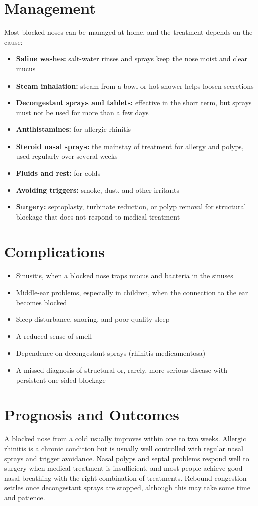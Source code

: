 \section*{Management}
Most blocked noses can be managed at home, and the treatment depends on the cause:

\begin{itemize}
    \item \textbf{Saline washes:} salt-water rinses and sprays keep the nose moist and clear mucus
    \item \textbf{Steam inhalation:} steam from a bowl or hot shower helps loosen secretions
    \item \textbf{Decongestant sprays and tablets:} effective in the short term, but sprays must not be used for more than a few days
    \item \textbf{Antihistamines:} for allergic rhinitis
    \item \textbf{Steroid nasal sprays:} the mainstay of treatment for allergy and polyps, used regularly over several weeks
    \item \textbf{Fluids and rest:} for colds
    \item \textbf{Avoiding triggers:} smoke, dust, and other irritants
    \item \textbf{Surgery:} septoplasty, turbinate reduction, or polyp removal for structural blockage that does not respond to medical treatment
\end{itemize}

\section*{Complications}
\begin{itemize}
    \item Sinusitis, when a blocked nose traps mucus and bacteria in the sinuses
    \item Middle-ear problems, especially in children, when the connection to the ear becomes blocked
    \item Sleep disturbance, snoring, and poor-quality sleep
    \item A reduced sense of smell
    \item Dependence on decongestant sprays (rhinitis medicamentosa)
    \item A missed diagnosis of structural or, rarely, more serious disease with persistent one-sided blockage
\end{itemize}

\section*{Prognosis and Outcomes}
A blocked nose from a cold usually improves within one to two weeks. Allergic rhinitis is a chronic condition but is usually well controlled with regular nasal sprays and trigger avoidance. Nasal polyps and septal problems respond well to surgery when medical treatment is insufficient, and most people achieve good nasal breathing with the right combination of treatments. Rebound congestion settles once decongestant sprays are stopped, although this may take some time and patience.

